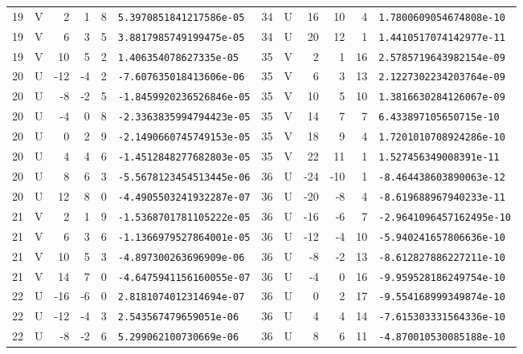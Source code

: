 \begin{longtable}{rcrrrl|rcrrrl}
19 & V & 2 & 1 & 8 & \texttt{5.3970851841217586e-05} & 34 & U & 16 & 10 & 4 & \texttt{1.7800609054674808e-10}\\
19 & V & 6 & 3 & 5 & \texttt{3.8817985749199475e-05} & 34 & U & 20 & 12 & 1 & \texttt{1.4410517074142977e-11}\\
19 & V & 10 & 5 & 2 & \texttt{1.406354078627335e-05} & 35 & V & 2 & 1 & 16 & \texttt{2.5785719643982154e-09}\\
20 & U & -12 & -4 & 2 & \texttt{-7.607635018413606e-06} & 35 & V & 6 & 3 & 13 & \texttt{2.1227302234203764e-09}\\
20 & U & -8 & -2 & 5 & \texttt{-1.8459920236526846e-05} & 35 & V & 10 & 5 & 10 & \texttt{1.3816630284126067e-09}\\
20 & U & -4 & 0 & 8 & \texttt{-2.3363835994794423e-05} & 35 & V & 14 & 7 & 7 & \texttt{6.433897105650715e-10}\\
20 & U & 0 & 2 & 9 & \texttt{-2.1490660745749153e-05} & 35 & V & 18 & 9 & 4 & \texttt{1.7201010708924286e-10}\\
20 & U & 4 & 4 & 6 & \texttt{-1.4512848277682803e-05} & 35 & V & 22 & 11 & 1 & \texttt{1.527456349008391e-11}\\
20 & U & 8 & 6 & 3 & \texttt{-5.5678123454513445e-06} & 36 & U & -24 & -10 & 1 & \texttt{-8.464438603890063e-12}\\
20 & U & 12 & 8 & 0 & \texttt{-4.4905503241932287e-07} & 36 & U & -20 & -8 & 4 & \texttt{-8.619688967940233e-11}\\
21 & V & 2 & 1 & 9 & \texttt{-1.5368701781105222e-05} & 36 & U & -16 & -6 & 7 & \texttt{-2.9641096457162495e-10}\\
21 & V & 6 & 3 & 6 & \texttt{-1.1366979527864001e-05} & 36 & U & -12 & -4 & 10 & \texttt{-5.940241657806636e-10}\\
21 & V & 10 & 5 & 3 & \texttt{-4.897300263696909e-06} & 36 & U & -8 & -2 & 13 & \texttt{-8.612827886227211e-10}\\
21 & V & 14 & 7 & 0 & \texttt{-4.6475941156160055e-07} & 36 & U & -4 & 0 & 16 & \texttt{-9.959528186249754e-10}\\
22 & U & -16 & -6 & 0 & \texttt{2.8181074012314694e-07} & 36 & U & 0 & 2 & 17 & \texttt{-9.554168999349874e-10}\\
22 & U & -12 & -4 & 3 & \texttt{2.543567479659051e-06} & 36 & U & 4 & 4 & 14 & \texttt{-7.615303331564336e-10}\\
22 & U & -8 & -2 & 6 & \texttt{5.299062100730669e-06} & 36 & U & 8 & 6 & 11 & \texttt{-4.870010530085188e-10}\\

\end{longtable}
